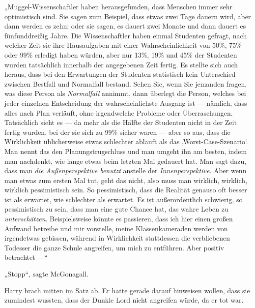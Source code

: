„Muggel-Wissenschaftler haben herausgefunden, dass Menschen immer sehr optimistisch sind. Sie sagen zum Beispiel, dass etwas zwei Tage dauern wird, aber dann werden es zehn; oder sie sagen, es dauert zwei Monate und dann dauert es fünfunddreißig Jahre. Die Wissenschaftler haben einmal Studenten gefragt, nach welcher Zeit sie ihre Hausaufgaben mit einer Wahrscheinlichkeit von 50\%, 75\% oder 99\% erledigt haben würden, aber nur 13\%, 19\% und 45\% der Studenten wurden tatsächlich innerhalb der angegebenen Zeit fertig. Es stellte sich auch heraus, dass bei den Erwartungen der Studenten statistisch kein Unterschied zwischen Bestfall und Normalfall bestand. Sehen Sie, wenn Sie jemanden fragen, was diese Person als \emph{Normalfall} annimmt, dann überlegt die Person, welches bei jeder einzelnen Entscheidung der wahrscheinlichste Ausgang ist — nämlich, dass alles nach Plan verläuft, ohne irgendwelche Probleme oder Überraschungen. Tatsächlich sieht es — da mehr als die Hälfte der Studenten nicht in der Zeit fertig wurden, bei der sie sich zu 99\% sicher waren — aber so aus, dass die Wirklichkeit üblicherweise etwas schlechter abläuft als das ‚Worst-Case-Szenario‘. Man nennt das den Planungstrugschluss und man umgeht ihn am besten, indem man nachdenkt, wie lange etwas beim letzten Mal gedauert hat. Man sagt dazu, dass man \emph{die Außenperspektive benutzt} anstelle der \emph{Innenperspektive}. Aber wenn man etwas zum ersten Mal tut, geht das nicht, also muss man wirklich, wirklich, wirklich pessimistisch sein. So pessimistisch, dass die Realität genauso oft besser ist als erwartet, wie schlechter als erwartet. Es ist außerordentlich schwierig, so pessimistisch zu sein, dass man eine gute Chance hat, das wahre Leben zu \emph{unterschätzen}. Beispielsweise könnte es passieren, dass ich hier einen großen Aufwand betreibe und mir vorstelle, meine Klassenkameraden werden von irgendetwas gebissen, während in Wirklichkeit stattdessen die verbliebenen Todesser die ganze Schule angreifen, um mich zu entführen. Aber positiv betrachtet —“

„Stopp“, sagte McGonagall.

Harry brach mitten im Satz ab. Er hatte gerade darauf hinweisen wollen, dass sie zumindest wussten, dass der Dunkle Lord nicht angreifen würde, da er tot war.

